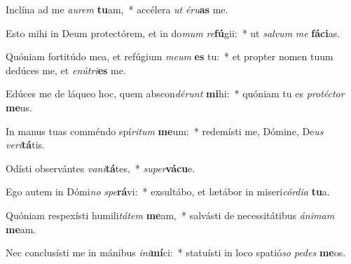 \item Inclína ad me \textit{au}\textit{rem} \textbf{tu}am,~* accélera \textit{ut} \textit{é}\textit{ru}\textbf{as} me.
\item Esto mihi in Deum protectórem, et in do\textit{mum} \textit{re}\textbf{fú}gii:~* ut \textit{sal}\textit{vum} \textit{me} \textbf{fá}\textbf{ci}as.
\item Quóniam fortitúdo mea, et refúgium \textit{me}\textit{um} \textbf{es} tu:~* et propter nomen tuum dedúces me, et \textit{e}\textit{nú}\textit{tri}\textbf{es} me.
\item Edúces me de láqueo hoc, quem abscon\textit{dé}\textit{runt} \textbf{mi}hi:~* quóniam tu es \textit{pro}\textit{téc}\textit{tor} \textbf{me}us.
\item In manus tuas comméndo spí\textit{ri}\textit{tum} \textbf{me}um:~* redemísti me, Dómine, De\textit{us} \textit{ve}\textit{ri}\textbf{tá}tis.
\item Odísti observántes \textit{va}\textit{ni}\textbf{tá}tes,~* \textit{su}\textit{per}\textbf{vá}\textbf{cu}e.
\item Ego autem in Dómi\textit{no} \textit{spe}\textbf{rá}vi:~* exsultábo, et lætábor in miseri\textit{cór}\textit{di}\textit{a} \textbf{tu}a.
\item Quóniam respexísti humili\textit{tá}\textit{tem} \textbf{me}am,~* salvásti de necessitátibus \textit{á}\textit{ni}\textit{mam} \textbf{me}am.
\item Nec conclusísti me in mánibus \textit{in}\textit{i}\textbf{mí}ci:~* statuísti in loco spatió\textit{so} \textit{pe}\textit{des} \textbf{me}os.
